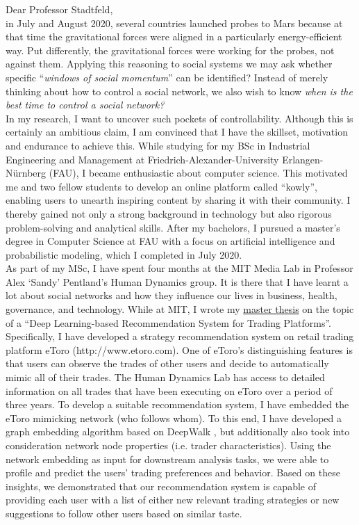 Dear Professor Stadtfeld,\\

in July and August 2020, several countries launched probes to Mars because at that time the gravitational forces were aligned in a particularly energy-efficient way. 
Put differently, the gravitational forces were working for the probes, not against them.
Applying this reasoning to social systems we may ask whether specific ``\textit{windows of social momentum}'' can be identified? 
Instead of merely thinking about how to control a social network, we also wish to know \textit{when is the best time to control a social network?}\\

In my research, I want to uncover such pockets of controllability. 
Although this is certainly an ambitious claim, I am convinced that I have the skillset, motivation and endurance to achieve this. 
While studying for my BSc in Industrial Engineering and Management at Friedrich-Alexander-University Erlangen-Nürnberg (FAU), I became enthusiastic about computer science. 
This motivated me and two fellow students to develop an online platform called ``kowly'', enabling users to unearth inspiring content by sharing it with their community. 
I thereby gained not only a strong background in technology but also rigorous problem-solving and analytical skills.
After my bachelors, I pursued a master's degree in Computer Science at FAU with a focus on artificial intelligence and probabilistic modeling, which I completed in July 2020. \\

As part of my MSc, I have spent four months at the MIT Media Lab in Professor Alex `Sandy' Pentland's Human Dynamics group. 
It is there that I have learnt a lot about social networks and how they influence our lives in business, health, governance, and technology.
While at MIT, I wrote my 
\href{https://www.dropbox.com/s/1t0fl1v2jmpsrrx/MasterThesis_TobiasClement_12%3A13%3A2019.pdf?dl=0}{master thesis} on the topic of a ``Deep Learning-based Recommendation System for Trading Platforms''. 
Specifically, I have developed a strategy recommendation system on retail trading platform eToro (http://www.etoro.com).
One of eToro's distinguishing features is that users can observe the trades of other users and decide to automatically mimic all of their trades.
The Human Dynamics Lab has access to detailed information on all trades that have been executing on eToro over a period of three years. 
To develop a suitable recommendation system, I have embedded the eToro mimicking network (who follows whom). 
To this end, I have developed a graph embedding algorithm based on DeepWalk \cite{perozzi2014deepwalk}, but additionally also took into consideration network node properties (i.e. trader characteristics). 
Using the network embedding as input for downstream analysis tasks, we were able to profile and predict the users' trading preferences and behavior. 
Based on these insights, we demonstrated that our recommendation system is capable of providing each user with a list of either new relevant trading strategies or new suggestions to follow other users based on similar taste.\\

